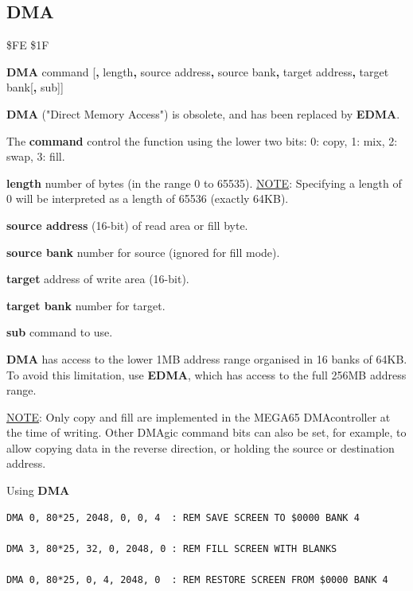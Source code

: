 \subsection{DMA}
\label{BASIC 65 Commands!DMA}
\begin{description}[leftmargin=2cm,style=nextline]
\item [Token:]    \$FE \$1F
\item [Format:]   {\bf DMA} command [{\bf,} length{\bf,} source address{\bf,} source bank{\bf,} target address{\bf,} target bank[{\bf,} sub]]
\item [Usage:]    {\bf DMA} ("Direct Memory Access") is obsolete, and has been replaced by {\bf EDMA}.

                  The {\bf command} control the function using the lower two bits: 0: copy, 1: mix, 2: swap, 3: fill.

                  {\bf length} number of bytes (in the range 0 to 65535). \underline{NOTE}: Specifying a length of 0 will be interpreted as a length of 65536 (exactly 64KB).

                  {\bf source address} (16-bit) of read area or fill byte.

                  {\bf source bank} number for source (ignored for fill mode).

                  {\bf target} address of write area (16-bit).

                  {\bf target bank} number for target.

                  {\bf sub} command to use.

\item [Remarks:]  {\bf DMA} has access to the lower 1MB address range organised in 16 banks of 64KB. To avoid this limitation, use {\bf EDMA}, which has access to the full 256MB address range.

                  \underline{NOTE}: Only copy and fill are implemented in the MEGA65 DMAcontroller at the time of writing. Other DMAgic command bits can also be set, for example, to allow copying data in the reverse direction, or holding the source or destination address.

\item [Examples:] Using {\bf DMA}

\begin{tcolorbox}[colback=black,coltext=white]
\verbatimfont{\codefont}
\begin{verbatim}
DMA 0, 80*25, 2048, 0, 0, 4  : REM SAVE SCREEN TO $0000 BANK 4

DMA 3, 80*25, 32, 0, 2048, 0 : REM FILL SCREEN WITH BLANKS

DMA 0, 80*25, 0, 4, 2048, 0  : REM RESTORE SCREEN FROM $0000 BANK 4
\end{verbatim}
\end{tcolorbox}
\end{description}

